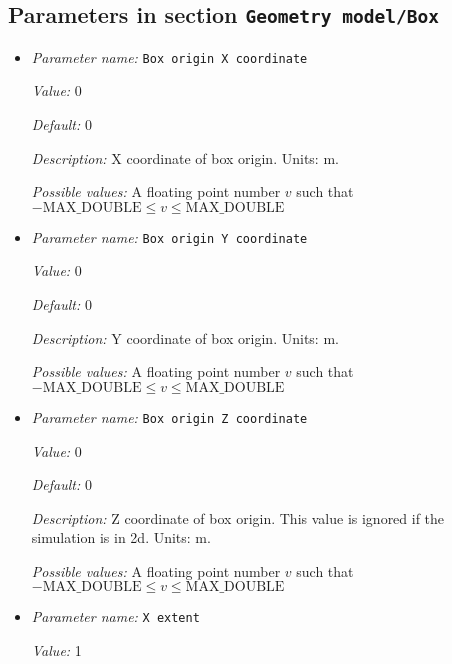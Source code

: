 


\subsection{Parameters in section \tt Geometry model/Box}
\label{parameters:Geometry_20model/Box}

\begin{itemize}
\item {\it Parameter name:} {\tt Box origin X coordinate}
\label{parameters:Geometry model/Box/Box origin X coordinate}


{\it Value:} 0


{\it Default:} 0


{\it Description:} X coordinate of box origin. Units: m.


{\it Possible values:} A floating point number $v$ such that $-\text{MAX\_DOUBLE} \leq v \leq \text{MAX\_DOUBLE}$
\item {\it Parameter name:} {\tt Box origin Y coordinate}
\label{parameters:Geometry model/Box/Box origin Y coordinate}


{\it Value:} 0


{\it Default:} 0


{\it Description:} Y coordinate of box origin. Units: m.


{\it Possible values:} A floating point number $v$ such that $-\text{MAX\_DOUBLE} \leq v \leq \text{MAX\_DOUBLE}$
\item {\it Parameter name:} {\tt Box origin Z coordinate}
\label{parameters:Geometry model/Box/Box origin Z coordinate}


{\it Value:} 0


{\it Default:} 0


{\it Description:} Z coordinate of box origin. This value is ignored if the simulation is in 2d. Units: m.


{\it Possible values:} A floating point number $v$ such that $-\text{MAX\_DOUBLE} \leq v \leq \text{MAX\_DOUBLE}$
\item {\it Parameter name:} {\tt X extent}
\label{parameters:Geometry model/Box/X extent}


{\it Value:} 1



\end{itemize}
